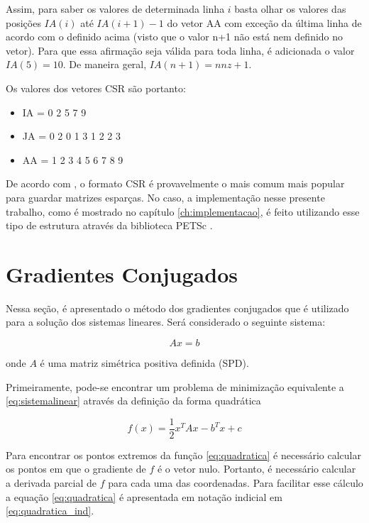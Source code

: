 Assim, para saber os valores de determinada linha $i$ basta olhar os valores das posições $IA(i)$ até $IA(i+1)-1$ do vetor AA com exceção da última linha de acordo com o definido acima (visto que o valor n+1 não está nem definido no vetor). Para que essa afirmação seja válida para toda linha, é adicionada o valor $IA(5) = 10$. De maneira geral, $IA(n+1) = nnz+1$.


Os valores dos vetores CSR são portanto:

\begin{center}
    \begin{itemize}
        \item IA = 0 2 5 7 9
        \item JA = 0 2 0 1 3 1 2 2 3
        \item AA = 1 2 3 4 5 6 7 8 9
    \end{itemize}
\end{center}


De acordo com \cite{solverlinear}, o formato CSR é provavelmente o mais comum mais popular para guardar matrizes esparças. No caso, a implementação nesse presente trabalho, como é mostrado no capítulo \ref{ch:implementacao}, é feito utilizando esse tipo de estrutura através da biblioteca PETSc \textcopyright.


\section{Gradientes Conjugados} \label{sec:cg}

Nessa seção, é apresentado o método dos gradientes conjugados que é utilizado para a solução dos sistemas lineares. Será considerado o seguinte sistema:

\begin{equation} \label{eq:sistemalinear}
    Ax = b
\end{equation}

onde $A$ é uma matriz simétrica positiva definida (SPD).


Primeiramente, pode-se encontrar um problema de minimização equivalente a \ref{eq:sistemalinear} através da definição da forma quadrática

\begin{equation} \label{eq:quadratica}
    f(x) = \frac{1}{2}  x^T A x - b^T x + c
\end{equation}

Para encontrar os pontos extremos da função \ref{eq:quadratica} é necessário calcular os pontos em que o gradiente de $f$ é o vetor nulo. Portanto, é necessário calcular a derivada parcial de $f$ para cada uma das coordenadas. Para facilitar esse cálculo a equação \ref{eq:quadratica} é apresentada em notação indicial em \ref{eq:quadratica_ind}.


